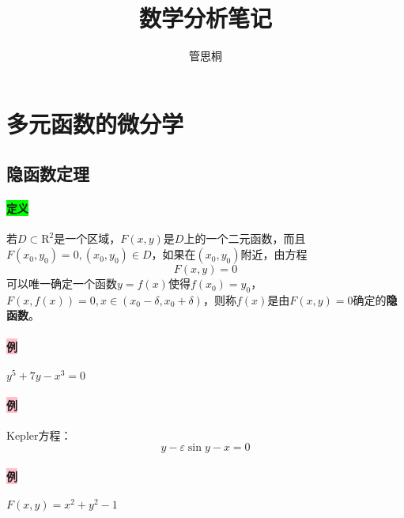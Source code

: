 \documentclass[UTF8]{ctexart}
\title{数学分析笔记}
\author{管思桐}
\date{}
\begin{document}
\maketitle
\tableofcontents
\newpage

\section{多元函数的微分学}

       \subsection{隐函数定理}
        \paragraph{\colorbox{lime}{定义}}若$D\subset \mathrm{R}^2$是一个区域，$F(x,y)$是$D$上的一个二元函数，而且$F(x_0,y_0)=0,(x_0,y_0)\in D$，如果在$(x_0,y_0)$附近，由方程
        $$F(x,y)=0$$
        可以唯一确定一个函数$y=f(x)$使得$f(x_0)=y_0$，$F(x,f(x))=0,x\in(x_0-\delta,x_0+\delta)$，则称$f(x)$是由$F(x,y)=0$确定的\textbf{隐函数}。
        \paragraph{\colorbox{pink}{例}}$y^5+7y-x^3=0$
        \paragraph{\colorbox{pink}{例}}Kepler方程：$$y-\varepsilon\sin y-x=0$$
        \paragraph{\colorbox{pink}{例}}$F(x,y)=x^2+y^2-1$
        
\end{document}
